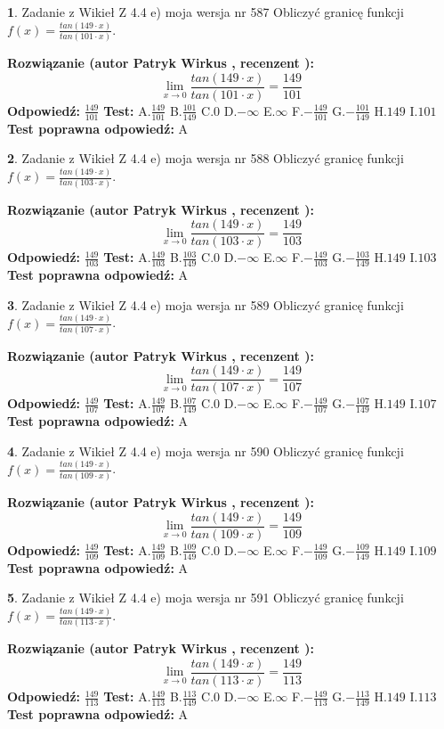 \documentclass[12pt, a4paper]{article}
\theoremstyle{definition} %
\newtheorem{zad}{}
\newcommand{\zadStart}[1]{\begin{zad}#1\newline}
\newcommand{\zadStop}{\end{zad}}
\newcommand{\rozwStart}[2]{\noindent \textbf{Rozwiązanie (autor #1 , recenzent #2): }\newline}
\newcommand{\rozwStop}{\newline}
\newcommand{\odpStart}{\noindent \textbf{Odpowiedź:}\newline}
\newcommand{\odpStop}{\newline}
\newcommand{\testStart}{\noindent \textbf{Test:}\newline}
\newcommand{\testStop}{\newline}
\newcommand{\kluczStart}{\noindent \textbf{Test poprawna odpowiedź:}\newline}
\newcommand{\kluczStop}{\newline}
\begin{document}
\zadStart{Zadanie z Wikieł Z 4.4 e) moja wersja nr 587}
Obliczyć granicę funkcji $f(x)=\frac{tan(149\cdot x)}{tan(101\cdot x)}$.
\zadStop
\rozwStart{Patryk Wirkus}{}
$$\lim\limits_{x\to 0}\frac{tan(149\cdot x)}{tan(101\cdot x)}=
\frac{149}{101}$$
\rozwStop
\odpStart
$\frac{149}{101}$
\odpStop
\testStart
A.$\frac{149}{101}$
B.$\frac{101}{149}$
C.$0$
D.$-\infty$
E.$\infty$
F.$-\frac{149}{101}$
G.$-\frac{101}{149}$
H.$149$
I.$101$
\testStop
\kluczStart
A
\kluczStop



\zadStart{Zadanie z Wikieł Z 4.4 e) moja wersja nr 588}
Obliczyć granicę funkcji $f(x)=\frac{tan(149\cdot x)}{tan(103\cdot x)}$.
\zadStop
\rozwStart{Patryk Wirkus}{}
$$\lim\limits_{x\to 0}\frac{tan(149\cdot x)}{tan(103\cdot x)}=
\frac{149}{103}$$
\rozwStop
\odpStart
$\frac{149}{103}$
\odpStop
\testStart
A.$\frac{149}{103}$
B.$\frac{103}{149}$
C.$0$
D.$-\infty$
E.$\infty$
F.$-\frac{149}{103}$
G.$-\frac{103}{149}$
H.$149$
I.$103$
\testStop
\kluczStart
A
\kluczStop



\zadStart{Zadanie z Wikieł Z 4.4 e) moja wersja nr 589}
Obliczyć granicę funkcji $f(x)=\frac{tan(149\cdot x)}{tan(107\cdot x)}$.
\zadStop
\rozwStart{Patryk Wirkus}{}
$$\lim\limits_{x\to 0}\frac{tan(149\cdot x)}{tan(107\cdot x)}=
\frac{149}{107}$$
\rozwStop
\odpStart
$\frac{149}{107}$
\odpStop
\testStart
A.$\frac{149}{107}$
B.$\frac{107}{149}$
C.$0$
D.$-\infty$
E.$\infty$
F.$-\frac{149}{107}$
G.$-\frac{107}{149}$
H.$149$
I.$107$
\testStop
\kluczStart
A
\kluczStop



\zadStart{Zadanie z Wikieł Z 4.4 e) moja wersja nr 590}
Obliczyć granicę funkcji $f(x)=\frac{tan(149\cdot x)}{tan(109\cdot x)}$.
\zadStop
\rozwStart{Patryk Wirkus}{}
$$\lim\limits_{x\to 0}\frac{tan(149\cdot x)}{tan(109\cdot x)}=
\frac{149}{109}$$
\rozwStop
\odpStart
$\frac{149}{109}$
\odpStop
\testStart
A.$\frac{149}{109}$
B.$\frac{109}{149}$
C.$0$
D.$-\infty$
E.$\infty$
F.$-\frac{149}{109}$
G.$-\frac{109}{149}$
H.$149$
I.$109$
\testStop
\kluczStart
A
\kluczStop



\zadStart{Zadanie z Wikieł Z 4.4 e) moja wersja nr 591}
Obliczyć granicę funkcji $f(x)=\frac{tan(149\cdot x)}{tan(113\cdot x)}$.
\zadStop
\rozwStart{Patryk Wirkus}{}
$$\lim\limits_{x\to 0}\frac{tan(149\cdot x)}{tan(113\cdot x)}=
\frac{149}{113}$$
\rozwStop
\odpStart
$\frac{149}{113}$
\odpStop
\testStart
A.$\frac{149}{113}$
B.$\frac{113}{149}$
C.$0$
D.$-\infty$
E.$\infty$
F.$-\frac{149}{113}$
G.$-\frac{113}{149}$
H.$149$
I.$113$
\testStop
\kluczStart
A
\kluczStop
\end{document}
